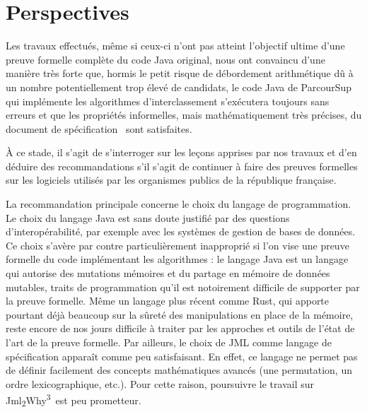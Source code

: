 \documentclass[a4paper]{report}
\newcommand{\jmlwhy}{\texorpdfstring{Jml\textsubscript{2}Why\textsuperscript{3}}{Jml2Why3}}
\begin{document}
\section{Perspectives}

Les travaux effectués, même si ceux-ci n'ont pas atteint l'objectif ultime d'une
preuve formelle complète du code Java original, nous ont convaincu d'une manière
très forte que, hormis le petit risque de débordement arithmétique dû à un
nombre potentiellement trop élevé de candidats, le code Java de ParcourSup qui implémente les
algorithmes d'interclassement s'exécutera toujours sans erreurs et que les
propriétés informelles, mais mathématiquement très précises, du
document de spécification~\cite{parcoursup-specifications} sont satisfaites.

À ce stade, il s'agit de s'interroger sur les leçons apprises par nos travaux et
d'en déduire des recommandations s'il s'agit de continuer à faire des preuves
formelles sur les logiciels utilisés par les organismes publics de la république
française.

La recommandation principale concerne le choix du langage de programmation. Le
choix du langage Java est sans doute justifié par des questions
d'interopérabilité, par exemple avec les systèmes de gestion de bases de
données. Ce choix s'avère par contre particulièrement inapproprié si l'on vise
une preuve formelle du code implémentant les algorithmes : le langage Java est
un langage qui autorise des mutations mémoires et du partage en mémoire de
données mutables, traits de programmation qu'il est notoirement difficile de
supporter par la preuve formelle. Même un langage plus récent comme Rust, qui
apporte pourtant déjà beaucoup sur la sûreté des manipulations en place de la
mémoire, reste encore de nos jours difficile à traiter par les approches et
outils de l'état de l'art de la preuve formelle.  Par ailleurs, le choix de JML
comme langage de spécification apparaît comme peu satisfaisant. En effet, ce
langage ne permet pas de définir facilement des concepts mathématiques avancés
(une permutation, un ordre lexicographique, etc.). Pour cette raison, poursuivre
le travail sur \jmlwhy\ est peu prometteur.
\end{document}
